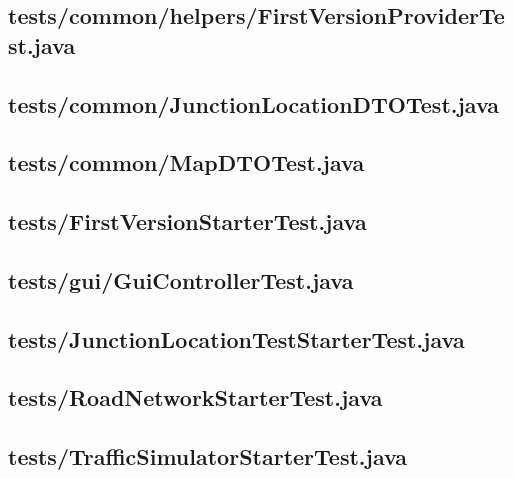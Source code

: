 
\newpage
\subsection{tests/common/helpers/FirstVersionProviderTest.java}

\newpage
\subsection{tests/common/JunctionLocationDTOTest.java}

\newpage
\subsection{tests/common/MapDTOTest.java}

\newpage
\subsection{tests/FirstVersionStarterTest.java}

\newpage
\subsection{tests/gui/GuiControllerTest.java}

\newpage
\subsection{tests/JunctionLocationTestStarterTest.java}

\newpage
\subsection{tests/RoadNetworkStarterTest.java}

\newpage
\subsection{tests/TrafficSimulatorStarterTest.java}

\newpage
